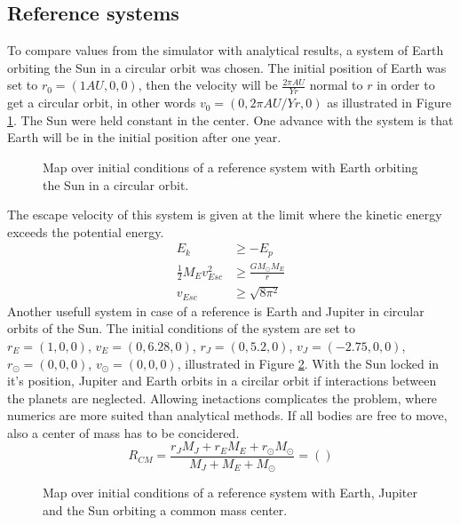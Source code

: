 \documentclass[twoside,twocolumn]{article}
\newcommand{\sun}{\odot}
\begin{document}
\subsection{Reference systems}
To compare values from the simulator with analytical results, a system of Earth orbiting the Sun in a circular orbit was chosen. The initial  position of Earth was set to $r_0=(1AU,0,0)$, then the velocity will be $\frac{2\pi AU}{Yr}$ normal to $r$ in order to get a circular orbit, in other words $v_0=(0,2\pi AU/Yr,0)$ as illustrated in Figure \ref{fig:two_body_system}. The Sun were held constant in the center. One advance with the system is that Earth will be in the initial position after one year.
\begin{figure}[t]
\centering
{}
\caption{Map over initial conditions of a reference system with Earth orbiting the Sun in a circular orbit.}\label{fig:two_body_system}
\end{figure}
The escape velocity of this system is given at the limit where the kinetic energy exceeds the potential energy.
\begin{align*}
E_k&\geq -E_p\\
\frac{1}{2}M_E v_{Esc}^2 &\geq \frac{GM_\sun M_E}{r}\\  
v_{Esc} &\geq \sqrt{8\pi^2}
\end{align*}
Another usefull system in case of a reference is Earth and Jupiter in circular orbits of the Sun. The initial conditions of the system are set to\\ $r_E=(1,0,0)$, $v_E=(0,6.28,0)$, $r_J=(0,5.2,0)$, $v_J=(-2.75,0,0)$, $r_\sun=(0,0,0)$, $v_\sun=(0,0,0)$, illustrated in Figure \ref{fig:three_body_system}. With the Sun locked in it's position, Jupiter and Earth orbits in a circilar orbit if interactions between the planets are neglected. Allowing inetactions complicates the problem, where numerics are more suited than analytical methods. If all bodies are free to move, also a center of mass has to be concidered.
$$R_{CM}=\frac{r_JM_J+r_EM_E+r_\sun M_\sun}{M_J+M_E+M_\sun} = ()$$
\begin{figure}[t]
\centering
{}
\caption{Map over initial conditions of a reference system with Earth, Jupiter and the Sun orbiting a common mass center.}\label{fig:three_body_system}
\end{figure}
\end{document}
